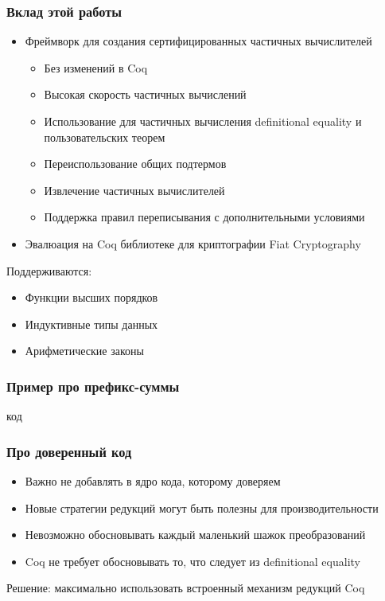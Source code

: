 \documentclass[xcolor=table]{beamer}
\begin{document}
\begin{frame}[fragile]
  \transwipe[direction=90]
  \frametitle{Вклад этой работы}
\begin{itemize}
  \item Фреймворк для создания сертифицированных частичных вычислителей
  \begin{itemize}
    \item Без изменений в Coq
    \item Высокая скорость частичных вычислений
    \item Использование для частичных вычисления definitional equality и пользовательских теорем
    \item Переиспользование общих подтермов
    \item Извлечение частичных вычислителей
    \item Поддержка правил переписывания с дополнительными условиями
  \end{itemize}
  \item Эвалюация на Coq библиотеке для криптографии Fiat Cryptography
\end{itemize}

Поддерживаются:

\begin{itemize}
  \item Функции высших порядков
  \item Индуктивные типы данных
  \item Арифметические законы
\end{itemize}
\end{frame}


\begin{frame}[fragile]
  \transwipe[direction=90]
  \frametitle{Пример про префикс-суммы}

\begin{center}
  код
\end{center}
\end{frame}

\begin{frame}[fragile]
  \transwipe[direction=90]
  \frametitle{Про доверенный код}
\begin{itemize}
  \item Важно не добавлять в ядро кода, которому доверяем
  \item Новые стратегии редукций могут быть полезны для производительности
  \item Невозможно обосновывать каждый маленький шажок преобразований
  \item Coq не требует обосновывать то, что следует из definitional equality
\end{itemize}

\bigskip
Решение: максимально использовать встроенный механизм редукций Coq
\end{frame}
\end{document}
